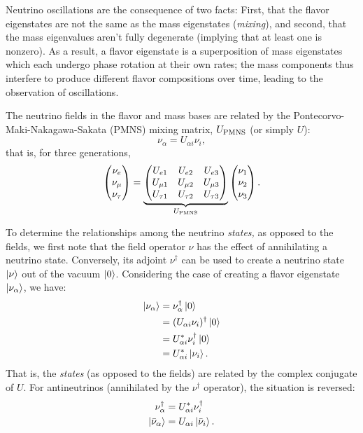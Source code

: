 \documentclass[../thesis.tex]{subfiles}
\begin{document}
Neutrino oscillations are the consequence of two facts: First, that the flavor eigenstates are not the same as the mass eigenstates (\emph{mixing}), and second, that the mass eigenvalues aren't fully degenerate (implying that at least one is nonzero). As a result, a flavor eigenstate is a superposition of mass eigenstates which each undergo phase rotation at their own rates; the mass components thus interfere to produce different flavor compositions over time, leading to the observation of oscillations.

The neutrino fields in the flavor and mass bases are related by the Pontecorvo-Maki-Nakagawa-Sakata (PMNS) mixing matrix, $U_\mathrm{PMNS}$ (or simply $U$):
\begin{equation}
  \nu_\alpha = U_{\alpha i} \nu_i,
\end{equation}
that is, for three generations,
\begin{equation}
  \begin{pmatrix} \nu_e \\ \nu_\mu \\ \nu_\tau \end{pmatrix} = \underbrace{\begin{pmatrix} U_{e 1} & U_{e 2} & U_{e 3} \\ U_{\mu 1} & U_{\mu 2} & U_{\mu 3} \\ U_{\tau 1} & U_{\tau 2} & U_{\tau 3} \end{pmatrix}}_{U_\mathrm{PMNS}} \begin{pmatrix} \nu_1 \\ \nu_2 \\ \nu_3 \end{pmatrix}.
\end{equation}

To determine the relationships among the neutrino \emph{states,} as opposed to the fields, we first note that the field operator $\nu$ has the effect of annihilating a neutrino state. Conversely, its adjoint $\nu^\dagger$ can be used to create a neutrino state $\ket{\nu}$ out of the vacuum $\ket{0}$. Considering the case of creating a flavor eigenstate $\ket{\nu_\alpha}$, we have:
\begin{equation}
  \label{eq:nuStateRel}
  \begin{aligned}
    \ket{\nu_\alpha} &= \nu_\alpha^\dagger \ket{0} \\
    &= (U_{\alpha i} \nu_i)^\dagger \ket{0} \\
    &= U_{\alpha i}^* \nu_i^\dagger \ket{0} \\
    &= U_{\alpha i}^* \ket{\nu_i}.
  \end{aligned}
\end{equation}
That is, the \emph{states} (as opposed to the fields) are related by the complex conjugate of $U$. For antineutrinos (annihilated by the $\nu^\dagger$ operator), the situation is reversed:
\begin{equation}
  \label{eq:antiNuStateRel}
  \begin{aligned}
    \nu^\dagger_\alpha &= U_{\alpha i}^* \nu^\dagger_i \\
    \ket{\bar\nu_\alpha} &= U_{\alpha i} \ket{\bar\nu_i}.
  \end{aligned}
\end{equation}
\end{document}
